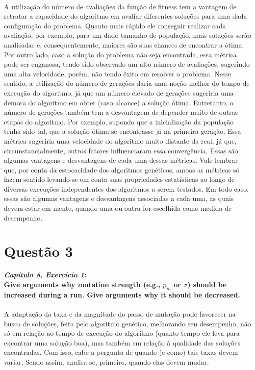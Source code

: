 \documentclass{report}
\begin{document}
\paragraph{} A utilização do número de avaliações da função de fitness tem a vantagem de retratar a capacidade do algoritmo em avaliar diferentes soluções para uma dada configuração do problema. Quanto mais rápido ele conseguir realizar cada avaliação, por exemplo, para um dado tamanho de população, mais soluções serão analisadas e, consequentemente, maiores são suas chances de encontrar a ótima. Por outro lado, caso a solução do problema não seja encontrada, essa métrica pode ser enganosa, tendo sido observado um alto número de avaliações, sugerindo uma alta velocidade, porém, não tendo êxito em resolver o problema. Nesse sentido, a utilização do número de gerações daria uma noção melhor do tempo de execução do algoritmo, já que um número elevado de gerações sugeriria uma demora do algoritmo em obter (caso alcance) a solução ótima. Entretanto, o número de gerações também tem a desvantagem de depender muito de outras etapas do algoritmo. Por exemplo, supondo que a inicialização da população tenha sido tal, que a solução ótima se encontrasse já na primeira geração. Essa métrica sugeriria uma velocidade do algoritmo muito distante da real, já que, circunstancialmente, outros fatores influenciaram essa convergência. Essas são algumas vantagens e desvantagens de cada uma dessas métricas. Vale lembrar que, por conta da estocacidade dos algoritmos genéticos, ambas as métricas só fazem sentido levando-se em conta suas propriedades estatísticas ao longo de diversas execuções independentes dos algoritmos a serem testados. Em todo caso, essas são algumas vantagens e desvantagens associadas a cada uma, as quais devem estar em mente, quando uma ou outra for escolhida como medida de desempenho. \\

\section*{Questão 3}

\textbf{\textit{Capítulo 8, Exercício 1}:}\\

\textbf{Give arguments why mutation strength (e.g., $p_m$ or $\sigma$) should be increased during a run. Give arguments why it should be decreased.}\\

\paragraph{} A adaptação da taxa e da magnitude do passo de mutação pode favorecer na busca de soluções, feita pelo algoritmo genético, melhorando seu desempenho, não só em relação ao tempo de execução do algoritmo (quanto tempo ele leva para encontrar uma solução boa), mas também em relação à qualidade das soluções encontradas. Com isso, cabe a pergunta de quando (e como) tais taxas devem variar. Sendo assim, analisa-se, primeiro, quando elas devem mudar.\\
\end{document}
